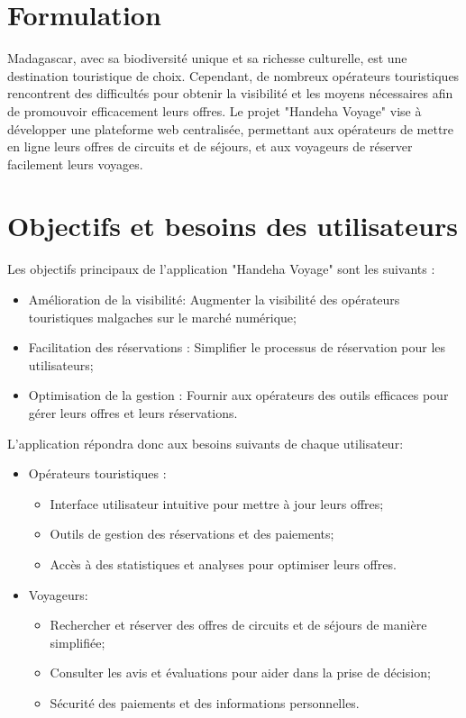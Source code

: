 \documentclass[12pt]{report}
\begin{document}
				\section{Formulation}
				
				\hspace{15pt} Madagascar, avec sa biodiversité unique et sa richesse culturelle, est une destination touristique de choix. Cependant, de nombreux opérateurs touristiques rencontrent des difficultés pour obtenir la visibilité et les moyens nécessaires afin de promouvoir efficacement leurs offres. Le projet "Handeha Voyage" vise à développer une plateforme web centralisée, permettant aux opérateurs de mettre en ligne leurs offres de circuits et de séjours, et aux voyageurs de réserver facilement leurs voyages.
	
				\section{Objectifs et besoins des utilisateurs}

						\hspace{15pt} Les objectifs principaux de l'application "Handeha Voyage" sont les suivants :
						\begin{itemize}
							\item Amélioration de la visibilité: Augmenter la visibilité des opérateurs touristiques malgaches sur le marché numérique;
							\item Facilitation des réservations : Simplifier le processus de réservation pour les utilisateurs;
							\item Optimisation de la gestion : Fournir aux opérateurs des outils efficaces pour gérer leurs offres et leurs réservations.
						\end{itemize}

						L'application répondra donc aux besoins suivants de chaque utilisateur:

						\begin{itemize}
							\item Opérateurs touristiques :
								\begin{itemize}
									\item Interface utilisateur intuitive pour mettre à jour leurs offres;
									\item Outils de gestion des réservations et des paiements;
									\item Accès à des statistiques et analyses pour optimiser leurs offres.
								\end{itemize}		
							\item Voyageurs:
								\begin{itemize}
									\item Rechercher et réserver des offres de circuits et de séjours de manière simplifiée;
									\item Consulter les avis et évaluations pour aider dans la prise de décision;
									\item Sécurité des paiements et des informations personnelles.
								\end{itemize}
						\end{itemize}
\end{document}
